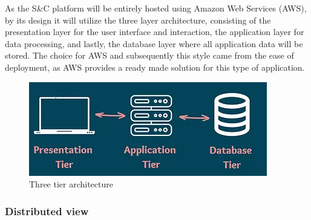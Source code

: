 As the S\&C platform will be entirely hosted using Amazon Web Services (AWS), by its design it will utilize the three layer architecture, consisting of the presentation layer for the user interface and interaction, the application layer for data processing, and lastly, the database layer where all application data will be stored. The choice for AWS and subsequently this style came from the ease of deployment, as AWS provides a ready made solution for this type of application.

\begin{figure}[h]
    \centering
    \includegraphics[width=0.75\linewidth]{DD-Latex//assets/Three tier.jpg}
    \caption{Three tier architecture \cite{MToC_2023}}
    \label{fig:enter-label}
\end{figure}

\subsubsection{Distributed view}
